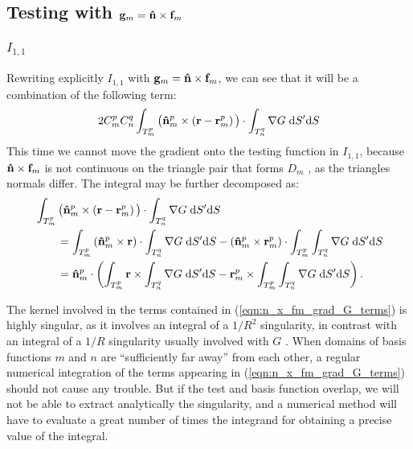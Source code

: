 \subsection{Testing with $\mathbf{g}_m = \mathbf{\Hat{n}} \times \mathbf{f}_m$}

\subsubsection{$I_{1,1}$}
%
\par
Rewriting explicitly $I_{1,1}$ with $\mathbf{g}_m = \mathbf{\Hat{n}} \times \mathbf{f}_m$, we can see that it will be a combination of the following term:
\begin{equation}
2 C_m^p C_n^q \int_{T_m^p} \big(\mathbf{\Hat{n}}_m^p \times \left(\mathbf{r}-\mathbf{r}_m^p \right) \big) \cdot \int_{T_n^q} \nabla G \; \text{d} S' \text{d} S
\end{equation}
This time we cannot move the gradient onto the testing function in $I_{1,1}$, because $\mathbf{\Hat{n}} \times \mathbf{f}_m$ is not continuous on the triangle pair that forms $D_m$ \cite{Taskinen_03}, as the triangles normals differ. The integral may be further decomposed as:
\begin{equation} \label{eqn:n_x_fm_grad_G_terms}
\begin{split}
&\int_{T_m^p} \big(\mathbf{\Hat{n}}_m^p \times \left(\mathbf{r}-\mathbf{r}_m^p \right) \big) \cdot \int_{T_n^q} \nabla G \; \text{d} S' \text{d} S \\
&\qquad = \int_{T_m^p} \left(\mathbf{\Hat{n}}_m^p \times \mathbf{r} \right) \cdot \int_{T_n^q} \nabla G \; \text{d} S' \text{d} S - \left(\mathbf{\Hat{n}}_m^p \times \mathbf{r}_m^p\right) \cdot \int_{T_m^p} \int_{T_n^q} \nabla G \; \text{d} S' \text{d} S \\
&\qquad  = \mathbf{\Hat{n}}_m^p \cdot \left(\int_{T_m^p} \mathbf{r} \times \int_{T_n^q} \nabla G \; \text{d} S' \text{d} S - \mathbf{r}_m^p \times \int_{T_m^p} \int_{T_n^q} \nabla G \; \text{d} S' \text{d} S\right).
\end{split}
\end{equation}
%
\par
The kernel involved in the terms contained in (\ref{eqn:n_x_fm_grad_G_terms}) is highly singular, as it involves an integral of a $1/R^2$ singularity, in contrast with an integral of a $1/R$ singularity usually involved with $G$ \cite{Taskinen_03}. When domains of basis functions $m$ and $n$ are ``sufficiently far away'' from each other, a regular numerical integration of the terms appearing in (\ref{eqn:n_x_fm_grad_G_terms}) should not cause any trouble. But if the test and basis function overlap, we will not be able to extract analytically the singularity, and a numerical method will have to evaluate a great number of times the integrand for obtaining a precise value of the integral. 
